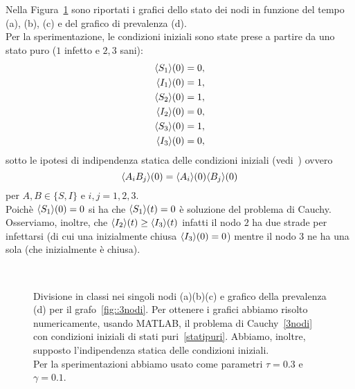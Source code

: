 Nella Figura~\ref{fig::spe3nodi} sono riportati i grafici dello stato dei nodi in funzione del tempo (a), (b), (c) e del grafico di prevalenza (d).\\
Per la sperimentazione, le condizioni iniziali sono state prese a partire da uno stato puro ($1$ infetto e $2,3$ sani):
\begin{equation}
\label{statipuri}
\begin{aligned}
\langle S_1 \rangle(0)&=0, \\
\langle I_1 \rangle(0) &=1, \\
\langle S_2 \rangle(0)&=1,\\
\langle I_2 \rangle(0)& = 0,\\ 
\langle S_3 \rangle(0)&= 1,\\
\langle I_3 \rangle(0) &= 0,\\
\end{aligned}
\end{equation}
sotto le ipotesi di indipendenza statica delle condizioni iniziali (vedi~\cite{MR3340258}) ovvero
$$
\langle A_i B_j \rangle(0) =\langle A_i \rangle(0) \langle B_j \rangle(0)$$ 
per $A,B\in \{ S, I\}$ e  $i,j=1, 2,3$.\\

Poich\`e $\langle S_1 \rangle(0)=0$ si ha che $\langle S_1 \rangle(t)=0$ \`e soluzione del problema di Cauchy.  Osserviamo,  inoltre, che $\langle I_2 \rangle(t)\geq \langle I_3 \rangle(t)$ infatti il nodo $2$ ha due strade per infettarsi (di cui una inizialmente chiusa $\langle I_3 \rangle(0)=0$) mentre il nodo $3$ ne ha una sola (che inizialmente \`e chiusa). 
\begin{figure}[ht]
\centering
\subfloat[][Nodo 1]
{\resizebox{0.45\textwidth}{!}{}}
 \quad 
\subfloat[][Nodo 2]
{\resizebox{0.45\textwidth}{!}{ }}
\\
\subfloat[][Nodo 3]
{\resizebox{0.45\textwidth}{!}
{}
}
\quad
\subfloat[][Prevalenza]
{\resizebox{0.45\textwidth}{!}
{}
}
\caption[Sperimentazione in MATLAB relativo al grafo~\ref{fig::3nodi}]{Divisione in classi nei singoli nodi (a)(b)(c) e grafico della prevalenza (d) per il grafo~\ref{fig::3nodi}.   Per ottenere i grafici abbiamo risolto numericamente,  usando MATLAB,  il problema di Cauchy~\eqref{3nodi} con condizioni iniziali  di stati puri~\eqref{statipuri}. Abbiamo,  inoltre,  supposto l'indipendenza statica delle condizioni iniziali.\\
Per la sperimentazioni abbiamo usato come parametri $\tau= 0.3$ e $\gamma =0.1 $.}\label{fig::spe3nodi}
\end{figure}




